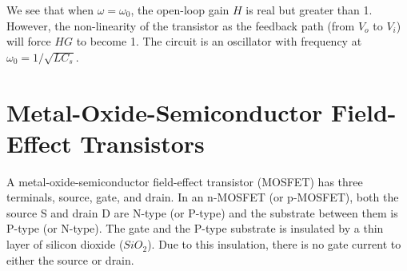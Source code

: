\documentclass{article}
\begin{document}
\begin{comment}
\begin{eqnarray}
  V_o&=&\frac{j\omega L}{j\omega L+1/j\omega C}\;V_t
  =\frac{\omega^2LC_1}{\omega^2LC_1-1}\;V_t
  \nonumber \\
  &=&\left(\frac{1-\omega^2LC_1}{1-\omega^2LC_1+j\omega R(C_1+C_2-\omega^2LC_1C_2)}\right)\;
  \left(\frac{\omega^2LC_1}{\omega^2LC_1-1}\right)\;V_i
  \nonumber \\
  &=&\frac{-\omega^2LC_1}{1-\omega^2LC_1+j\omega R(C_1+C_2-\omega^2LC_1C_2)}\;V_i
\end{eqnarray}

The open-loop gain (from $V_i$ to $V_o$) is:
\begin{equation}
H=\frac{V_o}{V_i}=\frac{-\omega^2LC_1}{1-\omega^2LC_1+j\omega R(C_1+C_2-\omega^2LC_1C_2)}
\end{equation}
At the resonant frequency $\omega_0$, the imaginary part is zero, we have
\begin{equation}
H=\frac{-\omega^2LC_1}{1-\omega^2LC_1}
=\frac{\omega_0^2LC_1}{\omega_0^2LC_1-1}
=\frac{LC_1/LC_s}{LC_1/LC_s-1}
=\frac{C_1}{C_1-C_s}
=\frac{C_1+C_2}{C_1}
\end{equation}
\end{comment}

We see that when $\omega=\omega_0$, the open-loop gain $H$ is real but
greater than 1. However, the non-linearity of the transistor as the 
feedback path (from $V_o$ to $V_i$) will force $HG$ to become 1. The 
circuit is an oscillator with frequency at $\omega_0=1/\sqrt{LC_s}$.

\begin{comment}
http://seit.unsw.adfa.edu.au/staff/sites/hrp/teaching/Electronics4/docs/PLL/colpitts.pdf

http://users.ece.gatech.edu/mleach/ece3050/notes/osc/wienbr.pdf

http://www.ece.msstate.edu/~winton/classes/ece3144/labs/Exp10.pdf

http://www.drp.fmph.uniba.sk/ESM/twin.pdf
\end{comment}


\section*{Metal-Oxide-Semiconductor Field-Effect Transistors}

A metal-oxide-semiconductor field-effect transistor (MOSFET) has three terminals,
source, gate, and drain. In an n-MOSFET (or p-MOSFET), both the source S and drain
D are N-type (or P-type) and the substrate between them is P-type (or N-type). 
The gate and the P-type substrate is insulated by a thin layer of silicon dioxide 
($SiO_2$). Due to this insulation, there is no gate current to either the source or
drain.
\end{document}

